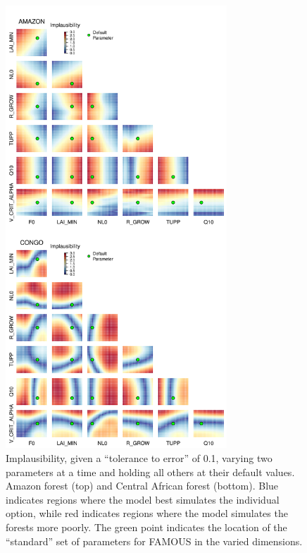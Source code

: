 \documentclass[esd, article]{copernicus} %
\begin{document}
\begin{figure}[t]
\includegraphics[width=8.3cm]{graphics/taat.png}
\caption{Implausibility, given a ``tolerance to error'' of 0.1, varying two parameters at a time and holding all others at their default values. Amazon forest (top) and Central African forest (bottom). Blue indicates regions where the model best simulates the individual option, while red indicates regions where the model simulates the forests more poorly. The green point indicates the location of the ``standard'' set of parameters for FAMOUS in the varied dimensions.}
\label{fig:taat}
\end{figure}
\end{document}
